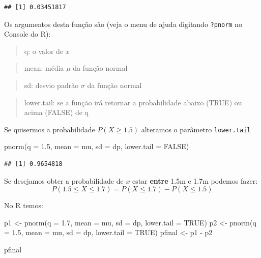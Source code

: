 \documentclass[
]{book}
\newenvironment{Shaded}{\begin{snugshade}}{\end{snugshade}}
\newcommand{\AttributeTok}[1]{\textcolor[rgb]{0.77,0.63,0.00}{#1}}
\newcommand{\ConstantTok}[1]{\textcolor[rgb]{0.00,0.00,0.00}{#1}}
\newcommand{\FloatTok}[1]{\textcolor[rgb]{0.00,0.00,0.81}{#1}}
\newcommand{\FunctionTok}[1]{\textcolor[rgb]{0.00,0.00,0.00}{#1}}
\newcommand{\NormalTok}[1]{#1}
\newcommand{\OtherTok}[1]{\textcolor[rgb]{0.56,0.35,0.01}{#1}}
\newcommand{\SpecialCharTok}[1]{\textcolor[rgb]{0.00,0.00,0.00}{#1}}
\begin{document}
\begin{verbatim}
## [1] 0.03451817
\end{verbatim}

Os argumentos desta função são (veja o menu de ajuda digitando \texttt{?pnorm} no Console do R):

\begin{quote}
q: o valor de \(x\)
\end{quote}

\begin{quote}
mean: média \(\mu\) da função normal
\end{quote}

\begin{quote}
sd: desvio padrão \(\sigma\) da função normal
\end{quote}

\begin{quote}
lower.tail: se a função irá retornar a probabilidade abaixo (TRUE) ou acima (FALSE) de q
\end{quote}

Se quisermos a probabilidade \(P(X \ge 1.5)\) alteramos o parâmetro \texttt{lower.tail}

\begin{Shaded}
\begin{Highlighting}[]
\FunctionTok{pnorm}\NormalTok{(}\AttributeTok{q =} \FloatTok{1.5}\NormalTok{, }\AttributeTok{mean =}\NormalTok{ mu, }\AttributeTok{sd =}\NormalTok{ dp, }\AttributeTok{lower.tail =} \ConstantTok{FALSE}\NormalTok{)}
\end{Highlighting}
\end{Shaded}

\begin{verbatim}
## [1] 0.9654818
\end{verbatim}

Se desejamos obter a probabilidade de \(x\) estar \textbf{entre} 1.5m e 1.7m podemos fazer: \[P(1.5 \le X \le 1.7) = P(X \le 1.7) - P(X \le 1.5)\]

No R temos:

\begin{Shaded}
\begin{Highlighting}[]
\NormalTok{p1 }\OtherTok{\textless{}{-}} \FunctionTok{pnorm}\NormalTok{(}\AttributeTok{q =} \FloatTok{1.7}\NormalTok{, }\AttributeTok{mean =}\NormalTok{ mu, }\AttributeTok{sd =}\NormalTok{ dp, }\AttributeTok{lower.tail =} \ConstantTok{TRUE}\NormalTok{)}
\NormalTok{p2 }\OtherTok{\textless{}{-}} \FunctionTok{pnorm}\NormalTok{(}\AttributeTok{q =} \FloatTok{1.5}\NormalTok{, }\AttributeTok{mean =}\NormalTok{ mu, }\AttributeTok{sd =}\NormalTok{ dp, }\AttributeTok{lower.tail =} \ConstantTok{TRUE}\NormalTok{)}
\NormalTok{pfinal }\OtherTok{\textless{}{-}}\NormalTok{ p1 }\SpecialCharTok{{-}}\NormalTok{ p2}

\NormalTok{pfinal}
\end{Highlighting}
\end{Shaded}
\end{document}
